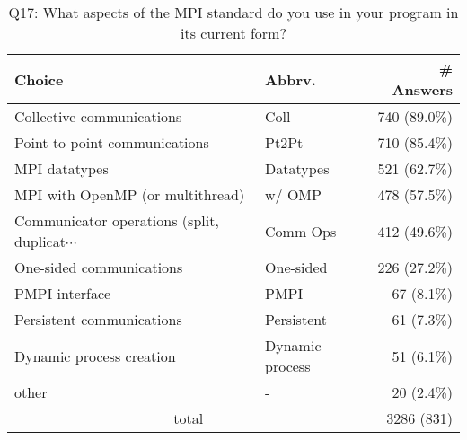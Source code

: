 \begin{table}[htb]%
\begin{center}%
\caption{Q17: What aspects of the MPI standard do you use in your program in its current form?}%
\label{tab:Q17-ans}%
\begin{tabular}{l|l|r}%
\hline%
Choice & Abbrv. & \# Answers \\%
\hline%
Collective communications & Coll & 740 (89.0\%) \\%
Point-to-point communications & Pt2Pt & 710 (85.4\%) \\%
MPI datatypes & Datatypes & 521 (62.7\%) \\%
MPI with OpenMP (or multithread) & w/ OMP & 478 (57.5\%) \\%
{\small Communicator operations (split, duplicat$\cdots$} & Comm Ops & 412 (49.6\%) \\%
One-sided communications & One-sided & 226 (27.2\%) \\%
PMPI interface & PMPI & 67 (8.1\%) \\%
Persistent communications & Persistent & 61 (7.3\%) \\%
Dynamic process creation & Dynamic process & 51 (6.1\%) \\%
other & - & 20 (2.4\%) \\%
\hline%
\multicolumn{2}{c}{total} & 3286 (831)\\%
\hline%
\end{tabular}%
\end{center}%
\end{table}%

